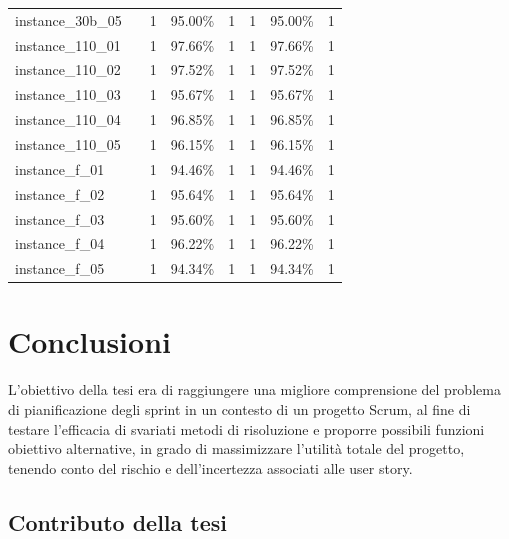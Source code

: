 \documentclass[12pt,a4paper,openright,twoside]{book}
\begin{document}
\begin{table}[H]
\begin{tabular}{|ll|rrr|rrr|}
 instance\_30b\_05             &     &    1   &     95.00\%  &  1      &    1   &     95.00\%  &  1          \\     
 instance\_110\_01            &     &    1   &     97.66\%  &   1     &    1   &     97.66\%  &   1         \\     
 instance\_110\_02            &     &    1   &     97.52\%  &   1     &    1   &     97.52\%  &   1          \\      
 instance\_110\_03            &     &    1   &     95.67\%  &   1     &    1   &     95.67\%  &   1          \\      
 instance\_110\_04            &     &    1   &     96.85\%  &   1     &    1   &     96.85\%  &   1         \\     
 instance\_110\_05            &     &    1   &     96.15\%  &   1     &    1   &     96.15\%  &   1         \\    
 instance\_f\_01              &     &    1  &      94.46\%  &   1     &    1  &      94.46\%  &   1         \\    
 instance\_f\_02              &     &    1   &     95.64\%  &   1     &    1   &     95.64\%  &   1         \\    
 instance\_f\_03              &     &    1  &      95.60\%  &   1     &    1  &      95.60\%  &   1      \\ 
 instance\_f\_04              &     &    1   &     96.22\%  &   1     &    1   &     96.22\%  &   1         \\    
 instance\_f\_05              &     &    1  &      94.34\%  &   1     &    1  &      94.34\%  &   1     \\   
  \hline
\end{tabular}

\end{table}


\chapter{Conclusioni}

L'obiettivo della tesi era di raggiungere una migliore comprensione del problema di pianificazione degli sprint in un contesto di un progetto Scrum, al fine di testare l'efficacia di svariati metodi di risoluzione e proporre possibili funzioni obiettivo alternative, in grado di massimizzare l'utilità totale del progetto, tenendo conto del rischio e dell'incertezza associati alle user story.

\section{Contributo della tesi}
\end{document}
